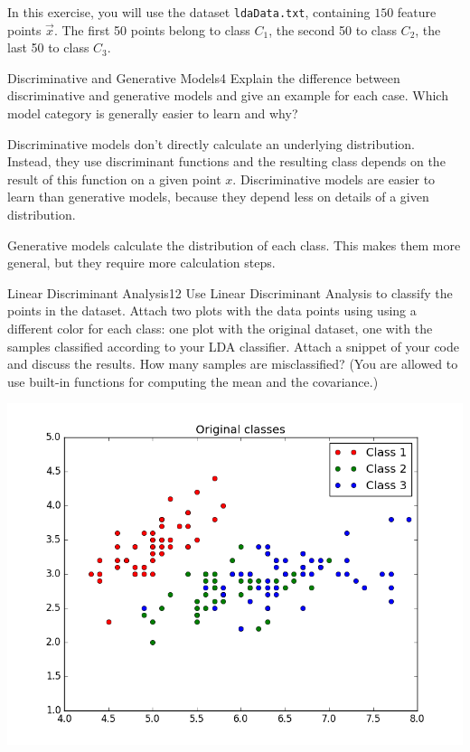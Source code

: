 \newif\ifvimbug
\vimbugfalse

\ifvimbug

\fi


In this exercise, you will use the dataset \texttt{ldaData.txt}, containing $150$ feature points $\vec x$. The first 50 points belong to class $C_1$, the second 50 to class $C_2$, the last 50 to class $C_3$.


\begin{questions}

\begin{question}{Discriminative and Generative Models}{4}
Explain the difference between discriminative and generative models and give an example for each case.
Which model category is generally easier to learn and why?
 
\begin{answer}
Discriminative models don't directly calculate an underlying distribution. Instead, they use discriminant functions and the resulting class depends on the result of this function on a given point $x$. Discriminative models are easier to learn than generative models, because they depend less on details of a given distribution.

Generative models calculate the distribution of each class. This makes them more general, but they require more calculation steps.
	
\end{answer}

\end{question}


\begin{question}{Linear Discriminant Analysis}{12}
Use Linear Discriminant Analysis to classify the points in the dataset. Attach two plots with the data points using using a different color for each class: one plot with the original dataset, one with the samples classified according to your LDA classifier. Attach a snippet of your code and discuss the results. How many samples are misclassified? (You are allowed to use built-in functions for computing the mean and the covariance.)

\begin{answer}
	\centering\includegraphics[width=0.7\linewidth]{./img/32b1.png}
	

\end{answer}
\end{question}
\end{questions}
